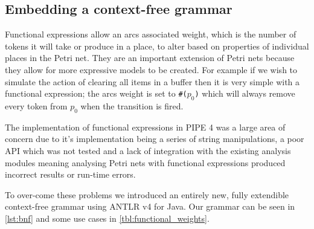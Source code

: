 \subsection{Embedding a context-free grammar}
Functional expressions allow an arcs associated weight, which is the number of tokens it will take or produce in a place, to alter based on properties of individual places in the Petri net. They are an important extension of Petri nets because they allow for more expressive models to be created. For example if we wish to simulate the action of clearing all items in a buffer then it is very simple with a functional expression; the arcs weight is set to \texttt{\#($p_0$)} which will always remove every token from $p_0$ when the transition is fired.

The implementation of functional expressions in PIPE 4 was a large area of concern due to it's implementation being a series of string manipulations, a poor API which was not tested and a lack of integration with the existing analysis modules meaning analysing Petri nets with functional expressions produced incorrect results or run-time errors.
% 

To over-come these problems we introduced an entirely new, fully extendible context-free grammar using ANTLR v4 for Java. Our grammar can be seen in \cref{lst:bnf} and some use cases in \cref{tbl:functional_weights}.

